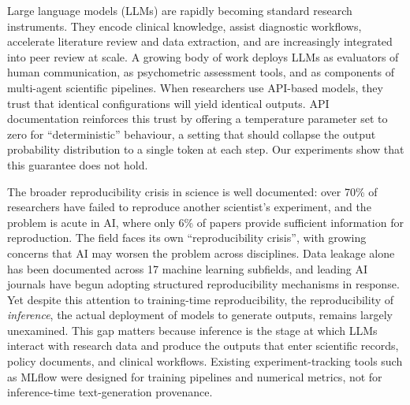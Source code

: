 \documentclass[sn-nature]{sn-jnl}
\begin{document}

\maketitle

\linenumbers


Large language models (LLMs) are rapidly becoming standard research instruments.
They encode clinical knowledge\cite{singhal2023large}, assist diagnostic workflows\cite{thirunavukarasu2023large}, accelerate literature review and data extraction\cite{birhane2023science}, and are increasingly integrated into peer review at scale\cite{thakkar2026llm}.
A growing body of work deploys LLMs as evaluators of human communication\cite{kumar2026reliable}, as psychometric assessment tools\cite{serapiogarcía2025psychometric}, and as components of multi-agent scientific pipelines\cite{xin2025agentic}.
When researchers use API-based models, they trust that identical configurations will yield identical outputs.
API documentation reinforces this trust by offering a temperature parameter set to zero for ``deterministic'' behaviour, a setting that should collapse the output probability distribution to a single token at each step.
Our experiments show that this guarantee does not hold.

The broader reproducibility crisis in science is well documented: over 70\% of researchers have failed to reproduce another scientist's experiment\cite{baker2016reproducibility}, and the problem is acute in AI, where only 6\% of papers provide sufficient information for reproduction\cite{gundersen2018state}.
The field faces its own ``reproducibility crisis''\cite{hutson2018artificial}, with growing concerns that AI may worsen the problem across disciplines\cite{ball2023ai}.
Data leakage alone has been documented across 17 machine learning subfields\cite{kapoor2023leakage}, and leading AI journals have begun adopting structured reproducibility mechanisms in response\cite{gundersen2024improving}.
Yet despite this attention to training-time reproducibility, the reproducibility of \emph{inference}, the actual deployment of models to generate outputs, remains largely unexamined.
This gap matters because inference is the stage at which LLMs interact with research data and produce the outputs that enter scientific records, policy documents, and clinical workflows.
Existing experiment-tracking tools such as MLflow\cite{zaharia2018accelerating} were designed for training pipelines and numerical metrics, not for inference-time text-generation provenance.
\end{document}
